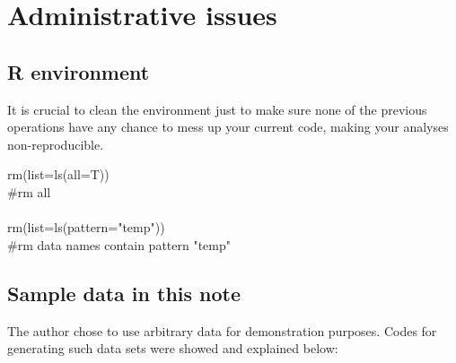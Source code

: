 \documentclass[../note.tex]{subfiles} %
\begin{document}
\section{Administrative issues}

\subsection{R environment}
It is crucial to clean the environment just to make sure none of the previous operations have any chance to mess up your current code, making your analyses non-reproducible.
\begin{code}
rm(list=ls(all=T))\\\#rm all\\\\
rm(list=ls(pattern="temp"))\\\#rm data names contain pattern "temp"
\end{code}

\subsection{Sample data in this note}
The author chose to use arbitrary data for demonstration purposes.  Codes for generating such data sets were showed and explained below:
\end{document}

